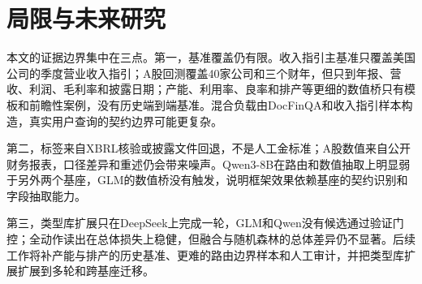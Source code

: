 

\section{局限与未来研究}

本文的证据边界集中在三点。第一，基准覆盖仍有限。收入指引主基准只覆盖美国公司的季度营业收入指引；A股回测覆盖40家公司和三个财年，但只到年报、营收、利润、毛利率和披露日期；产能、利用率、良率和排产等更细的数值桥只有模板和前瞻性案例，没有历史端到端基准。混合负载由DocFinQA和收入指引样本构造，真实用户查询的契约边界可能更复杂。

第二，标签来自XBRL核验或披露文件回退，不是人工金标准；A股数值来自公开财务报表，口径差异和重述仍会带来噪声。Qwen3-8B在路由和数值抽取上明显弱于另外两个基座，GLM的数值桥没有触发，说明框架效果依赖基座的契约识别和字段抽取能力。

第三，类型库扩展只在DeepSeek上完成一轮，GLM和Qwen没有候选通过验证门控；全动作读出在总体损失上稳健，但融合与随机森林的总体差异仍不显著。后续工作将补产能与排产的历史基准、更难的路由边界样本和人工审计，并把类型库扩展扩展到多轮和跨基座迁移。



\clearpage
{}
{}
{\setlength{\baselineskip}{16pt}}

\appendix

